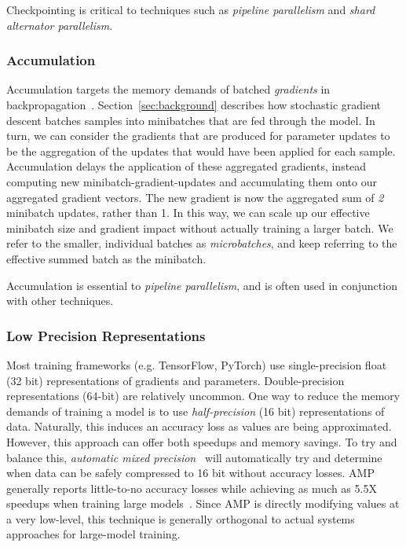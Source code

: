 Checkpointing is critical to techniques such as \textit{pipeline parallelism} and \textit{shard alternator parallelism}.

\subsubsection{Accumulation}\label{sec:accum}
Accumulation targets the memory demands of batched \textit{gradients} in backpropagation~\cite{gpipe2019}. Section~\ref{sec:background} describes how stochastic gradient descent batches samples into minibatches that are fed through the model. In turn, we can consider the gradients that are produced for parameter updates to be the aggregation of the updates that would have been applied for each sample. Accumulation delays the application of these aggregated gradients, instead computing new minibatch-gradient-updates and accumulating them onto our aggregated gradient vectors. The new gradient is now the aggregated sum of \textit{2} minibatch updates, rather than 1. In this way, we can scale up our effective minibatch size and gradient impact without actually training a larger batch. We refer to the smaller, individual batches as \textit{microbatches}, and keep referring to the effective summed batch as the minibatch. 

Accumulation is essential to \textit{pipeline parallelism}, and is often used in conjunction with other techniques.

\subsubsection{Low Precision Representations}
Most training frameworks (e.g. TensorFlow, PyTorch) use single-precision float (32 bit) representations of gradients and parameters. Double-precision representations (64-bit) are relatively uncommon. One way to reduce the memory demands of training a model is to use \textit{half-precision} (16 bit) representations of data. Naturally, this induces an accuracy loss as values are being approximated. However, this approach can offer both speedups and memory savings. To try and balance this, \textit{automatic mixed precision}~\cite{amp2020} will automatically try and determine when data can be safely compressed to 16 bit without accuracy losses. AMP generally reports little-to-no accuracy losses while achieving as much as 5.5X speedups when training large models~\cite{amp2020}. Since AMP is directly modifying values at a very low-level, this technique is generally orthogonal to actual systems approaches for large-model training. 

